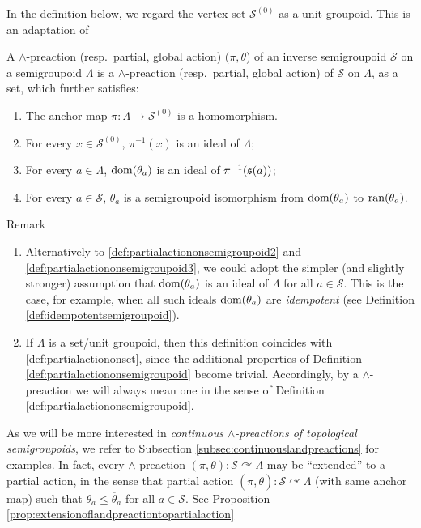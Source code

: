 In the definition below, we regard the vertex set $\mathcal{S}^{(0)}$ as a unit groupoid. This is an adaptation of \cite[p. 3660]{MR2982887}

\begin{definition}\label{def:partialactiononsemigroupoid}
    A $\land$-preaction (resp.\ partial, global action) $(\pi,\theta$) of an inverse semigroupoid $\mathcal{S}$ on a semigroupoid $\Lambda$ is a $\land$-preaction (resp.\ partial, global action) of $\mathcal{S}$ on $\Lambda$, as a set, which further satisfies:
    \begin{enumerate}[label=(\roman*)]
        \item\label{def:partialactiononsemigroupoid1} The anchor map $\pi\colon\Lambda\to\mathcal{S}^{(0)}$ is a homomorphism.
        \item\label{def:partialactiononsemigroupoid2} For every $x\in\mathcal{S}^{(0)}$, $\pi^{-1}(x)$ is an ideal of $\Lambda$;
        \item\label{def:partialactiononsemigroupoid3} For every $a\in\Lambda$, $\operatorname{dom}(\theta_a)$ is an ideal of $\pi^{-1}(\operatorname{\mathfrak{s}}(a))$;
        \item\label{def:partialactiononsemigroupoid4} For every $a\in\mathcal{S}$, $\theta_a$ is a semigroupoid isomorphism from $\operatorname{dom}(\theta_a)$ to $\operatorname{ran}(\theta_a)$.
    \end{enumerate}
\end{definition}

\begin{denv*}{Remark}
\begin{enumerate}
    \item Alternatively to \ref{def:partialactiononsemigroupoid2} and \ref{def:partialactiononsemigroupoid3}, we could adopt the simpler (and slightly stronger) assumption that $\operatorname{dom}(\theta_a)$ is an ideal of $\Lambda$ for all $a\in\mathcal{S}$. This is the case, for example, when all such ideals $\operatorname{dom}(\theta_a)$ are \emph{idempotent} (see Definition \ref{def:idempotentsemigroupoid}).
    \item If $\Lambda$ is a set/unit groupoid, then this definition coincides with \ref{def:partialactiononset}, since the additional properties of Definition \ref{def:partialactiononsemigroupoid} become trivial. Accordingly, by a $\land$-preaction we will always mean one in the sense of Definition \ref{def:partialactiononsemigroupoid}.
\end{enumerate}
\end{denv*}

As we will be more interested in \emph{continuous $\land$-preactions of topological semigroupoids}, we refer to Subsection \ref{subsec:continuouslandpreactions} for examples. In fact, every $\land$-preaction $(\pi,\theta)\colon\mathcal{S}\curvearrowright\Lambda$ may be ``extended'' to a partial action, in the sense that partial action $(\pi,\overline{\theta})\colon\mathcal{S}\curvearrowright\Lambda$ (with same anchor map) such that $\theta_a\leq\overline{\theta}_a$ for all $a\in\mathcal{S}$. See Proposition \ref{prop:extensionoflandpreactiontopartialaction}

